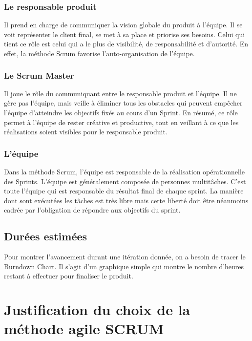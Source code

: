 \subsubsection{Le responsable produit}

Il prend en charge de communiquer la
vision globale du produit à l'équipe. 
Il se voit représenter le client final, se met à sa place
et priorise ses besoins. Celui qui tient ce rôle est celui qui 
a le plus de visibilité, de responsabilité et d'autorité.
En effet, la méthode Scrum favorise l'auto-organisation de l'équipe.

\subsubsection{Le Scrum Master}

Il joue le rôle du communiquant entre le responsable produit et
l'équipe. Il ne gère pas l'équipe, mais veille à éliminer tous les obstacles qui peuvent
empêcher l'équipe d'atteindre les objectifs fixés au cours d'un Sprint. En résumé, ce rôle
permet à l'équipe de rester créative et productive, tout en veillant à ce que les
réalisations soient visibles pour le responsable produit.

\subsubsection{L'équipe}

Dans la méthode Scrum, l'équipe est responsable de la réalisation
opérationnelle des Sprints. L'équipe est généralement composée de personnes
multitâches. C'est toute l'équipe qui est responsable du résultat final de chaque sprint.
La manière dont sont exécutées les tâches est très libre mais cette liberté doit être
néanmoins cadrée par l'obligation de répondre aux objectifs du sprint.

\subsection{Durées estimées}

Pour montrer l'avancement durant une itération donnée, on a besoin de tracer le
Burndown Chart. Il s'agit d'un graphique simple qui montre le nombre d'heures restant
à effectuer pour finaliser le produit. 

\section{Justification du choix de la méthode agile SCRUM}

